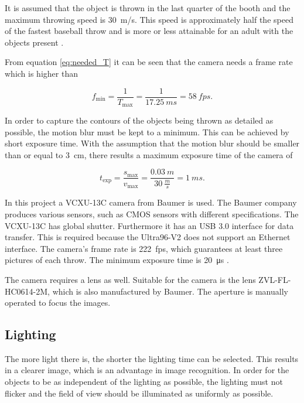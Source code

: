 It is assumed that the object is thrown in the last quarter of the booth and the maximum throwing speed is \SI{30}{m/s}.
This speed is approximately half the speed of the fastest baseball throw and is more or less attainable for an adult with the objects present \cite{SpeedBaseball}.

From equation \ref{eq:needed_T} it can be seen that the camera needs a frame rate which is higher than

\begin{equation}
  f_\text{min} = \frac{1}{T_\text{max}} = \frac{1}{\SI{17.25}{ms}} = \SI{58}{fps}.
  \label{eq:needed_fps}
\end{equation}

In order to capture the contours of the objects being thrown as detailed as possible, the motion blur must be kept to a minimum. 
This can be achieved by short exposure time. 
With the assumption that the motion blur should be smaller than or equal to \SI{3}{cm}, there results a maximum exposure time of the camera of

\begin{equation}
  t_\text{exp} = \frac{s_\text{max}}{v_\text{max}} = \frac{\SI{0.03}{m}}{\SI{30}{\frac{m}{s}}} = \SI{1}{ms}.
  \label{eq:texp}
\end{equation}

In this project a VCXU-13C camera from Baumer is used.
The Baumer company produces various sensors, such as CMOS sensors with different specifications.
The VCXU-13C has global shutter.
Furthermore it has an USB 3.0 interface for data transfer.
This is required because the Ultra96-V2 does not support an Ethernet interface.
The camera's frame rate is \SI{222}{fps}, which guarantees at least three pictures of each throw.
The minimum exposure time is \SI{20}{\micro s} \cite{BaumerCam}.

The camera requires a lens as well.
Suitable for the camera is the lens ZVL-FL-HC0614-2M, which is also manufactured by Baumer.
The aperture is manually operated to focus the images.

\subsection{Lighting}
\label{subsec:Lighting}
The more light there is, the shorter the lighting time can be selected.
This results in a clearer image, which is an advantage in image recognition.
In order for the objects to be as independent of the lighting as possible, the lighting must not flicker and the field of view should be illuminated as uniformly as possible.

